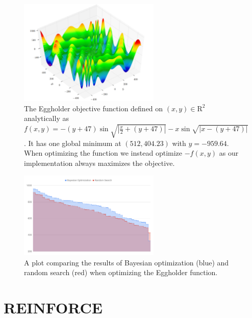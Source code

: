 \begin{figure}
	\begin{center}
		\includegraphics[width=0.6\textwidth]{images/eggholder.png}
		\caption{The Eggholder objective function defined on $(x, y) \in \mathrm{R}^2$ analytically as $f(x, y) = -(y + 47) \sin \sqrt{| \frac{x}{2} + (y + 47)|} - x \sin \sqrt{| x - (y + 47)|} $. It has one global minimum at $(512, 404.23)$ with $y = -959.64$. When optimizing the function we instead optimize $-f(x,y)$ as our implementation always maximizes the objective.}
		\label{figure:eggholder}
	\end{center}
\end{figure}


\begin{figure}
	\begin{center}
		\includegraphics[width=0.6\textwidth]{images/eggholder-comparison.png}
		\caption{A plot comparing the results of Bayesian optimization (blue) and random search (red) when optimizing the Eggholder function.}
		\label{figure:eggholder-comparison}
	\end{center}
\end{figure}

\section{REINFORCE}
\label{section:experiments-empirical-bayes}

